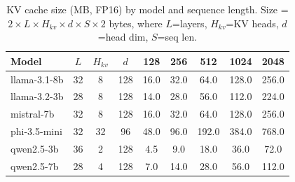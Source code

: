 \begin{table}[t]
\centering
\caption{KV cache size (MB, FP16) by model and sequence length. Size = $2 \times L \times H_{kv} \times d \times S \times 2$ bytes, where $L$=layers, $H_{kv}$=KV heads, $d$=head dim, $S$=seq len.}
\label{tab:kv_sizes}
\small
\begin{tabular}{lcccccccc}
\toprule
\textbf{Model} & $L$ & $H_{kv}$ & $d$ & \textbf{128} & \textbf{256} & \textbf{512} & \textbf{1024} & \textbf{2048} \\
\midrule
  llama-3.1-8b & 32 & 8 & 128 & 16.0 & 32.0 & 64.0 & 128.0 & 256.0 \\
  llama-3.2-3b & 28 & 8 & 128 & 14.0 & 28.0 & 56.0 & 112.0 & 224.0 \\
  mistral-7b & 32 & 8 & 128 & 16.0 & 32.0 & 64.0 & 128.0 & 256.0 \\
  phi-3.5-mini & 32 & 32 & 96 & 48.0 & 96.0 & 192.0 & 384.0 & 768.0 \\
  qwen2.5-3b & 36 & 2 & 128 & 4.5 & 9.0 & 18.0 & 36.0 & 72.0 \\
  qwen2.5-7b & 28 & 4 & 128 & 7.0 & 14.0 & 28.0 & 56.0 & 112.0 \\
\bottomrule
\end{tabular}
\end{table}